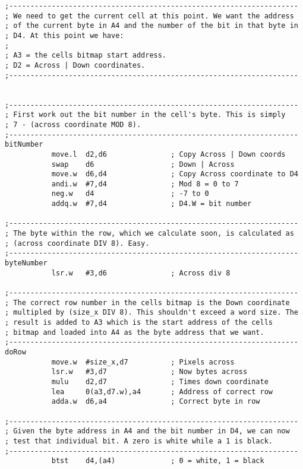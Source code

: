\begin{lstlisting}[firstnumber=last,caption={Langtons Ant - Pixel Calculations}]
;--------------------------------------------------------------------
; We need to get the current cell at this point. We want the address
; of the current byte in A4 and the number of the bit in that byte in
; D4. At this point we have:
;
; A3 = the cells bitmap start address.
; D2 = Across | Down coordinates.
;--------------------------------------------------------------------


;--------------------------------------------------------------------
; First work out the bit number in the cell's byte. This is simply
; 7 - (across coordinate MOD 8).
;--------------------------------------------------------------------
bitNumber
           move.l  d2,d6               ; Copy Across | Down coords
           swap    d6                  ; Down | Across
           move.w  d6,d4               ; Copy Across coordinate to D4
           andi.w  #7,d4               ; Mod 8 = 0 to 7
           neg.w   d4                  ; -7 to 0
           addq.w  #7,d4               ; D4.W = bit number

;--------------------------------------------------------------------
; The byte within the row, which we calculate soon, is calculated as
; (across coordinate DIV 8). Easy.
;--------------------------------------------------------------------
byteNumber
           lsr.w   #3,d6               ; Across div 8

;--------------------------------------------------------------------
; The correct row number in the cells bitmap is the Down coordinate
; multipled by (size_x DIV 8). This shouldn't exceed a word size. The
; result is added to A3 which is the start address of the cells
; bitmap and loaded into A4 as the byte address that we want.
;--------------------------------------------------------------------
doRow
           move.w  #size_x,d7          ; Pixels across
           lsr.w   #3,d7               ; Now bytes across
           mulu    d2,d7               ; Times down coordinate
           lea     0(a3,d7.w),a4       ; Address of correct row
           adda.w  d6,a4               ; Correct byte in row

;--------------------------------------------------------------------
; Given the byte address in A4 and the bit number in D4, we can now
; test that individual bit. A zero is white while a 1 is black.
;--------------------------------------------------------------------
           btst    d4,(a4)             ; 0 = white, 1 = black

\end{lstlisting}

